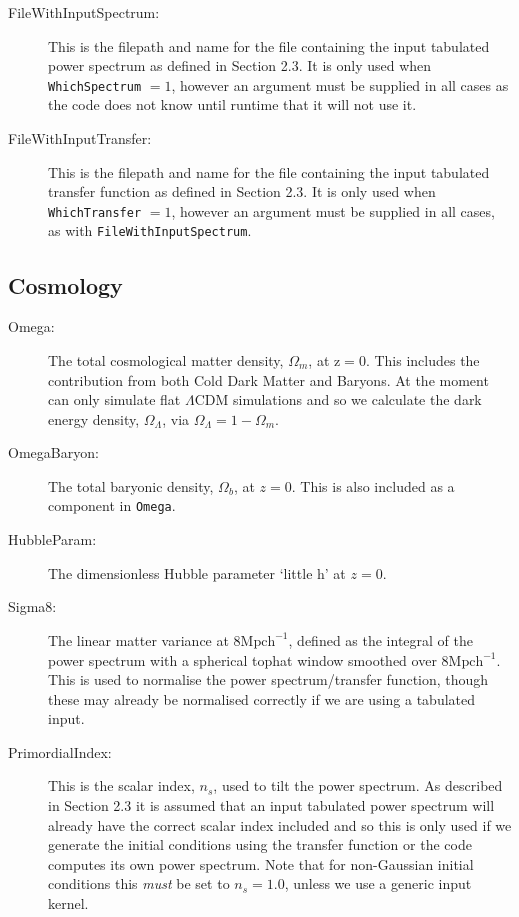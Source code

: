\documentclass[12pt,twoside,a4paper]{article}
\begin{document}
\begin{description}
\item[FileWithInputSpectrum:]{This is the filepath and name for the file containing the input tabulated power spectrum as defined in Section 2.3. It is only used when \texttt{WhichSpectrum} $ = 1$, however an argument must be supplied in all cases as the code does not know until runtime that it will not use it.}
\item[FileWithInputTransfer:]{This is the filepath and name for the file containing the input tabulated transfer function as defined in Section 2.3. It is only used when \texttt{WhichTransfer} $ = 1$, however an argument must be supplied in all cases, as with \texttt{FileWithInputSpectrum}.}
\end{description}

\subsection{Cosmology}
\begin{description}
\item[Omega:]{The total cosmological matter density, $\Omega_{m}$, at $\text{z}=0$. This includes the contribution from both Cold Dark Matter and Baryons. At the moment {\PICOLA} can only simulate flat $\Lambda\text{CDM}$ simulations and so we calculate the dark energy density, $\Omega_{\Lambda}$, via $\Omega_{\Lambda} = 1-\Omega_{m}$.}
\item[OmegaBaryon:]{The total baryonic density, $\Omega_{b}$, at $z=0$. This is also included as a component in \texttt{Omega}.}
\item[HubbleParam:]{The dimensionless Hubble parameter `little h' at $z=0$.}
\item[Sigma8:]{The linear matter variance at $8\text{Mpch}^{-1}$, defined as the integral of the power spectrum with a spherical tophat window smoothed over $8\text{Mpch}^{-1}$. This is used to normalise the power spectrum/transfer function, though these may already be normalised correctly if we are using a tabulated input.}
\item[PrimordialIndex:]{This is the scalar index, $n_{s}$, used to tilt the power spectrum. As described in Section 2.3 it is assumed that an input tabulated power spectrum will already have the correct scalar index included and so this is only used if we generate the initial conditions using the transfer function or the code computes its own power spectrum. Note that for non-Gaussian initial conditions this \emph{must} be set to $n_{s}=1.0$, unless we use a generic input kernel.}
\end{description}
\end{document}
